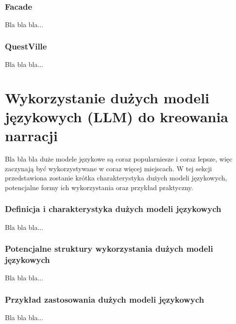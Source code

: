 \subsubsection*{Facade}

Bla bla bla...

\subsubsection*{QuestVille}

Bla bla bla...

\section{Wykorzystanie dużych modeli językowych (LLM) do kreowania narracji}\label{section:ch2_2}

Bla bla bla duże modele językowe są coraz popularniesze i coraz lepsze, więc zaczynają być
wykorzystywane w coraz więcej miejscach. W tej sekcji przedstawiona zostanie krótka charakterystyka
dużych modeli językowych, potencjalne formy ich wykorzystania oraz przykład praktyczny.

\subsubsection*{Definicja i charakterystyka dużych modeli językowych}

Bla bla bla...

\subsubsection*{Potencjalne struktury wykorzystania dużych modeli językowych}

Bla bla bla...

\subsubsection*{Przykład zastosowania dużych modeli językowych}

Bla bla bla...